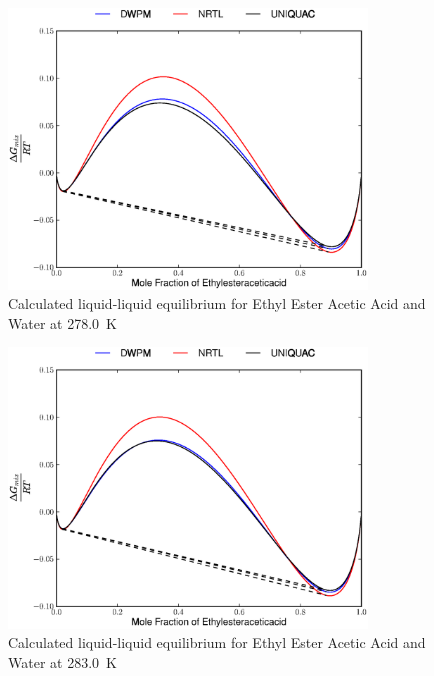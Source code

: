 \begin{figure}[hp]
\centering
\includegraphics[width = 0.85\textwidth]{Results_Parts/BinaryParams/ethylesteraceticacid-water/AllModelsGibbsPlots/T_278.0.eps}
\caption{Calculated liquid-liquid equilibrium for Ethyl Ester Acetic Acid and Water at 278.0~$\mathrm{K}$} 
\end{figure}

\begin{figure}[hp]
\centering
\includegraphics[width = 0.85\textwidth]{Results_Parts/BinaryParams/ethylesteraceticacid-water/AllModelsGibbsPlots/T_283.0.eps}
\caption{Calculated liquid-liquid equilibrium for Ethyl Ester Acetic Acid and Water at 283.0~$\mathrm{K}$}
\end{figure}

